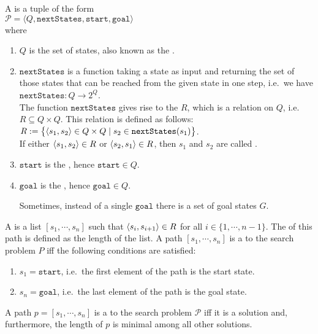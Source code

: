 \begin{Definition}
  A  is a tuple of the form
  \\[0.2cm]
  \hspace*{1.3cm}
  $\mathcal{P} = \langle Q,\mathtt{nextStates}, \mathtt{start}, \mathtt{goal}\rangle$
  \\[0.2cm]
  where
  \begin{enumerate}
  \item $Q$ is the set of states, also known as the .
  \item $\texttt{nextStates}$ is a function taking a state as input and returning the set of those
        states that can be reached from the given state in one step,
        i.e.~we have
        \\[0.2cm]
        \hspace*{1.3cm}
        $\texttt{nextStates}:Q \rightarrow 2^Q$.
        \\[0.2cm]
        The function $\mathtt{nextStates}$ gives rise to the  $R$, which is a
        relation on $Q$, i.e.~$R \subseteq Q \times Q$.  This relation is defined as follows:
        \\[0.2cm]
        \hspace*{1.3cm}
        $R := \bigl\{ \pair(s_1, s_2) \in Q \times Q \mid s_2 \in \mathtt{nextStates}(s_1) \bigr\}$.
        \\[0.2cm]
        If either $\pair(s_1, s_2) \in R$ or $\pair(s_2, s_1) \in R$, then  $s_1$ and $s_2$ are
        called .
  \item $\mathtt{start}$ is the , hence $\mathtt{start} \in Q$.
  \item $\mathtt{goal}$ is the , hence $\mathtt{goal} \in Q$.

        Sometimes, instead of a single $\mathtt{goal}$ there is a set of goal states $G$.
  \end{enumerate}
  A  is a list $[s_1, \cdots, s_n]$ such that $\pair(s_i, s_{i+1}) \in R$ for all $i \in
  \{1,\cdots,n-1\}$.
  The  of this path is defined as the length of the list.
  A path $[s_1, \cdots, s_n]$ is a  to the search problem $P$ iff the following
  conditions are satisfied:
  \begin{enumerate}
  \item $s_1 = \mathtt{start}$, i.e.~the first element of the path is the start state.
  \item $s_n = \mathtt{goal}$, i.e.~the last element of the path is the goal state.
  \end{enumerate}
  A path $p = [s_1, \cdots, s_n]$ is a  to the search problem $\mathcal{P}$
  iff it is a solution and, furthermore, the length of $p$ is minimal among all other solutions. \eoxs
\end{Definition}

